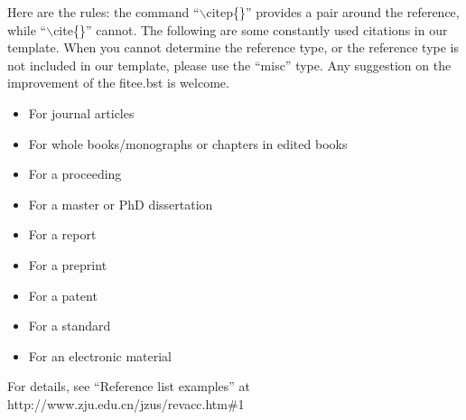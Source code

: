 \documentclass[twoside,twocolumn]{article}
\begin{document}
Here are the rules: the command ``$\backslash$citep\{\}'' provides a pair
around the reference, while ``$\backslash$cite\{\}'' cannot. The
following are some constantly used citations in our template. When
you cannot determine the reference type, or the reference type is
not included in our template, please use the ``misc'' type. Any
suggestion on the improvement of the fitee.bst is welcome.
\begin{itemize}
\itemsep -1pt
\item For journal articles \citep{Kampf02, TWFS03, Yu10}
\item For whole books/monographs \citep{Gregersen06} or chapters in edited books \citep{Prigogine76}
\item For a proceeding \citep{GQMPSD06}
\item For a master or PhD dissertation \citep{Rizvi06}
\item For a report \citep{Sweeney00}
\item For a preprint \citep{WAWYCZM08}
\item For a patent \citep{Cookson85}
\item For a standard \citep{ISO82}
\item For an electronic material \citep{Sheffield01}
\end{itemize}

For details, see ``Reference list examples'' at http://www.zju.edu.cn/jzus/revacc.htm\#1

\balance



\end{document}
